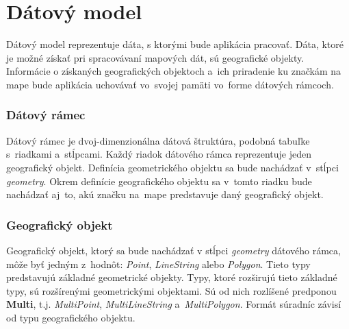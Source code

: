 \section{Dátový model}
Dátový model reprezentuje dáta, s ktorými bude aplikácia pracovať. Dáta, ktoré je možné získať pri spracovávaní mapových dát, sú geografické objekty. Informácie o získaných geografických objektoch a~ich priradenie ku značkám na mape bude aplikácia uchovávať vo~svojej pamäti vo~forme dátových rámcoch.

\subsubsection{Dátový rámec}
Dátový rámec je dvoj-dimenzionálna dátová štruktúra, podobná tabuľke s~riadkami a~stĺpcami. Každý riadok dátového rámca reprezentuje jeden geografický objekt. Definícia geometrického objektu sa bude nachádzať v~stĺpci \emph{geometry}. Okrem definície geografického objektu sa v~tomto riadku bude nachádzať aj~to, akú značku na~mape predstavuje daný geografický objekt. 

\subsubsection{Geografický objekt}
Geografický objekt, ktorý sa bude nachádzať v stĺpci \emph{geometry} dátového rámca, môže byť jedným z~hodnôt: \emph{Point}, \emph{LineString} alebo \emph{Polygon}. Tieto typy predstavujú základné geometrické objekty. Typy, ktoré rozširujú tieto základné typy, sú rozšírenými geometrickými objektami. Sú od nich rozlíšené predponou \textbf{Multi}, t.j. \emph{MultiPoint}, \emph{MultiLineString} a~\emph{MultiPolygon}. Formát súradníc závisí od typu geografického objektu.

